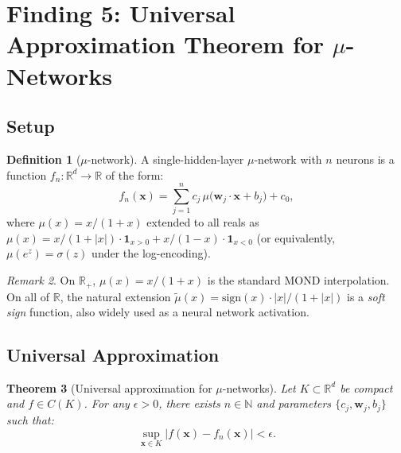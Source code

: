 \documentclass[11pt]{article}
\newtheorem{theorem}{Theorem}[section]
\theoremstyle{definition}
\newtheorem{definition}[theorem]{Definition}
\theoremstyle{remark}
\newtheorem{remark}[theorem]{Remark}
\begin{document}
\section{Finding 5: Universal Approximation Theorem for $\mu$-Networks}
\label{sec:approximation}

\subsection{Setup}

\begin{definition}[$\mu$-network]
A single-hidden-layer $\mu$-network with $n$ neurons is a function
$f_n: \mathbb{R}^d \to \mathbb{R}$ of the form:
\begin{equation}
  f_n(\mathbf{x}) = \sum_{j=1}^n c_j\,
  \mu\bigl(\mathbf{w}_j \cdot \mathbf{x} + b_j\bigr)
  + c_0,
  \label{eq:mu-network}
\end{equation}
where $\mu(x) = x/(1+x)$ extended to all reals as
$\mu(x) = x/(1+|x|) \cdot \mathbf{1}_{x > 0} + x/(1-x) \cdot
\mathbf{1}_{x < 0}$ (or equivalently, $\mu(e^z) = \sigma(z)$
under the log-encoding).
\end{definition}

\begin{remark}
On $\mathbb{R}_+$, $\mu(x) = x/(1+x)$ is the standard MOND
interpolation. On all of $\mathbb{R}$, the natural extension
$\tilde\mu(x) = \text{sign}(x) \cdot |x|/(1+|x|)$ is a
\emph{soft sign} function, also widely used as a neural network
activation.
\end{remark}

\subsection{Universal Approximation}

\begin{theorem}[Universal approximation for $\mu$-networks]
\label{thm:UA}
Let $K \subset \mathbb{R}^d$ be compact and $f \in C(K)$. For any
$\epsilon > 0$, there exists $n \in \mathbb{N}$ and parameters
$\{c_j, \mathbf{w}_j, b_j\}$ such that:
\begin{equation}
  \sup_{\mathbf{x} \in K} |f(\mathbf{x}) - f_n(\mathbf{x})|
  < \epsilon.
  \label{eq:UA}
\end{equation}
\end{theorem}
\end{document}
